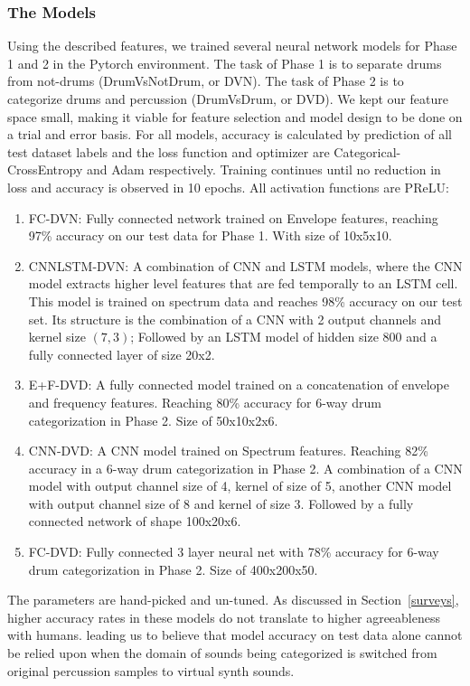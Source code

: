 \documentclass[\main/thesis.tex]{subfiles}
\begin{document}
\label{sec:ear}
\subsubsection{The Models}
\label{TPE_models}
Using the described features, we trained several neural network models for Phase 1 and 2 in the Pytorch environment. The task of Phase 1 is to separate drums from not-drums (DrumVsNotDrum, or DVN). The task of Phase 2 is to categorize drums and percussion (DrumVsDrum, or DVD). We kept our feature space small, making it viable for feature selection and model design to be done on a trial and error basis. For all models, accuracy is calculated by prediction of all test dataset labels and the loss function and optimizer are Categorical-CrossEntropy and Adam respectively. Training continues until no reduction in loss and accuracy is observed in 10 epochs.  All activation functions are PReLU:
\begin {enumerate}
\item FC-DVN: Fully connected network trained on Envelope features, reaching 97\% accuracy on our test data for Phase 1. With size of 10x5x10.
\item CNNLSTM-DVN: A combination of CNN and LSTM models, where the CNN model extracts higher level features that are fed temporally to an LSTM cell. This model is trained on spectrum data and reaches 98\% accuracy on our test set. Its structure is the combination of a CNN with 2 output channels and kernel size $(7,3)$; Followed by an LSTM model of hidden size 800 and a fully connected layer of size 20x2.
\item E+F-DVD: A fully connected model trained on a concatenation of envelope and frequency features. Reaching 80\% accuracy for 6-way drum categorization in Phase 2. Size of 50x10x2x6.
\item CNN-DVD: A CNN model trained on Spectrum features. Reaching 82\% accuracy in a 6-way drum categorization in Phase 2. A combination of a CNN model with output channel size of 4, kernel of size of 5, another CNN model with output channel size of 8 and kernel of size 3. Followed by a fully connected network of shape 100x20x6.
\item FC-DVD: Fully connected 3 layer neural net with 78\% accuracy for 6-way drum categorization in Phase 2. Size of 400x200x50.
\end{enumerate}
The parameters are hand-picked and un-tuned. As discussed in Section~\ref{surveys}, higher accuracy rates in these models do not translate to higher agreeableness with humans. leading us to believe that model accuracy on test data alone cannot be relied upon when the domain of sounds 
being categorized is switched from original percussion samples to virtual synth sounds.
\end{document}
